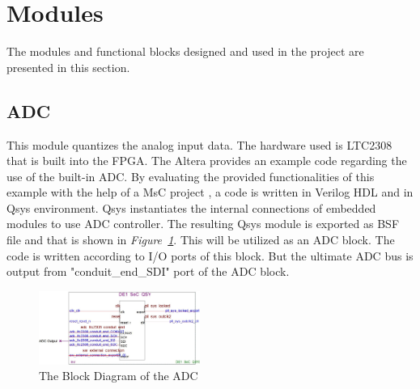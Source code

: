 \documentclass[paper]{IEEEtran}
\begin{document}
\section{Modules}
The modules and functional blocks designed and used in the project are presented in this section.

\subsection{ADC} \- \indent
		This module quantizes the analog input data. The hardware used is LTC2308 that is built into the FPGA. The Altera provides an example code regarding the use of the built-in ADC\cite{b1}. By evaluating the provided functionalities of this example with the help of a MsC project \cite{b2}, a code is written in Verilog HDL and in Qsys environment. Qsys instantiates the internal connections of embedded modules to use ADC controller. The resulting Qsys module is exported as BSF file and that is shown in \textit{Figure~\ref{fig:adc_block}}. This will be utilized as an ADC block. The code is written according to I/O ports of this block. But the ultimate ADC bus is output from "conduit\_end\_SDI" port of the ADC block. 
		
		\begin{figure}[t!]
			\setlength{\unitlength}{\textwidth}
			\center 
			\includegraphics[width=0.47\textwidth]{adc_block}
			\caption{\label{fig:adc_block}The Block Diagram of the ADC}
		\end{figure}
\end{document}

